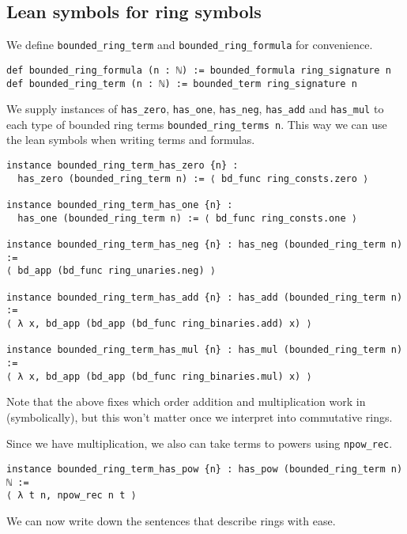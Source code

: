 \subsection{Lean symbols for ring symbols}

We define \texttt{bounded\_ring\_term} and \texttt{bounded\_ring\_formula}
for convenience.

\begin{lstlisting}
def bounded_ring_formula (n : ℕ) := bounded_formula ring_signature n
def bounded_ring_term (n : ℕ) := bounded_term ring_signature n\end{lstlisting}

We supply instances of \texttt{has\_zero}, \texttt{has\_one}, \texttt{has\_neg},
\texttt{has\_add} and \texttt{has\_mul} to each type of bounded ring terms
\texttt{bounded\_ring\_terms n}.
This way we can use the lean symbols when writing terms and formulas.

\begin{lstlisting}
instance bounded_ring_term_has_zero {n} :
  has_zero (bounded_ring_term n) := ⟨ bd_func ring_consts.zero ⟩

instance bounded_ring_term_has_one {n} :
  has_one (bounded_ring_term n) := ⟨ bd_func ring_consts.one ⟩

instance bounded_ring_term_has_neg {n} : has_neg (bounded_ring_term n) :=
⟨ bd_app (bd_func ring_unaries.neg) ⟩

instance bounded_ring_term_has_add {n} : has_add (bounded_ring_term n) :=
⟨ λ x, bd_app (bd_app (bd_func ring_binaries.add) x) ⟩

instance bounded_ring_term_has_mul {n} : has_mul (bounded_ring_term n) :=
⟨ λ x, bd_app (bd_app (bd_func ring_binaries.mul) x) ⟩\end{lstlisting}

Note that the above fixes which order
addition and multiplication work in (symbolically),
but this won't matter once we interpret into commutative rings.

Since we have multiplication, we also can take terms to powers
using \texttt{npow\_rec}.

\begin{lstlisting}
instance bounded_ring_term_has_pow {n} : has_pow (bounded_ring_term n) ℕ :=
⟨ λ t n, npow_rec n t ⟩
\end{lstlisting}

We can now write down the sentences that describe rings with ease.

